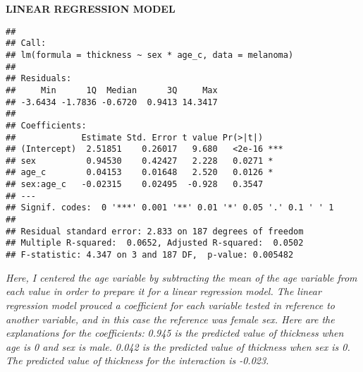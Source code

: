 \documentclass[]{article}
\newenvironment{Shaded}{\begin{snugshade}}{\end{snugshade}}
\newcommand{\DataTypeTok}[1]{\textcolor[rgb]{0.13,0.29,0.53}{#1}}
\newcommand{\KeywordTok}[1]{\textcolor[rgb]{0.13,0.29,0.53}{\textbf{#1}}}
\newcommand{\NormalTok}[1]{#1}
\newcommand{\OperatorTok}[1]{\textcolor[rgb]{0.81,0.36,0.00}{\textbf{#1}}}
\newcommand{\OtherTok}[1]{\textcolor[rgb]{0.56,0.35,0.01}{#1}}
\newcommand{\StringTok}[1]{\textcolor[rgb]{0.31,0.60,0.02}{#1}}
\begin{document}
\textbf{LINEAR REGRESSION MODEL}

\begin{Shaded}
\end{Shaded}

\begin{verbatim}
## 
## Call:
## lm(formula = thickness ~ sex * age_c, data = melanoma)
## 
## Residuals:
##     Min      1Q  Median      3Q     Max 
## -3.6434 -1.7836 -0.6720  0.9413 14.3417 
## 
## Coefficients:
##             Estimate Std. Error t value Pr(>|t|)    
## (Intercept)  2.51851    0.26017   9.680   <2e-16 ***
## sex          0.94530    0.42427   2.228   0.0271 *  
## age_c        0.04153    0.01648   2.520   0.0126 *  
## sex:age_c   -0.02315    0.02495  -0.928   0.3547    
## ---
## Signif. codes:  0 '***' 0.001 '**' 0.01 '*' 0.05 '.' 0.1 ' ' 1
## 
## Residual standard error: 2.833 on 187 degrees of freedom
## Multiple R-squared:  0.0652, Adjusted R-squared:  0.0502 
## F-statistic: 4.347 on 3 and 187 DF,  p-value: 0.005482
\end{verbatim}

\emph{Here, I centered the age variable by subtracting the mean of the
age variable from each value in order to prepare it for a linear
regression model. The linear regression model prouced a coefficient for
each variable tested in reference to another variable, and in this case
the reference was female sex. Here are the explanations for the
coefficients:} \emph{0.945 is the predicted value of thickness when age
is 0 and sex is male.} \emph{0.042 is the predicted value of thickness
when sex is 0.} \emph{The predicted value of thickness for the
interaction is -0.023.}

\begin{Shaded}
\end{Shaded}
\end{document}
